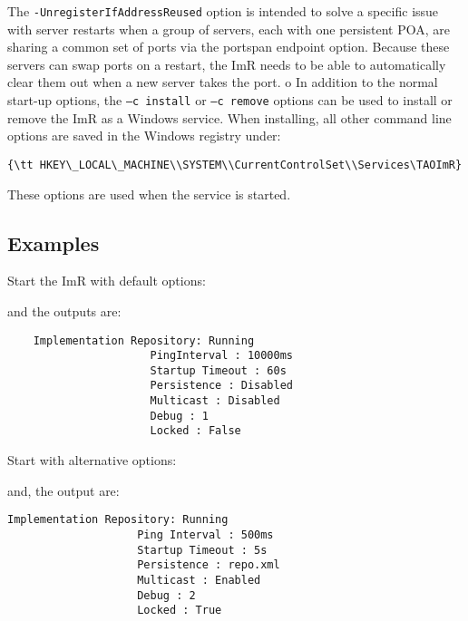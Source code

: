 The {\tt -UnregisterIfAddressReused} option is intended to solve a specific issue with server restarts
when a group of servers, each with one persistent POA, are sharing a common set of ports via the
portspan endpoint option. Because these servers can swap ports on a restart, the ImR needs to be able
to automatically clear them out when a new server takes the port.
o
In addition to the normal start-up options, the {\tt–c install} or {\tt–c remove} options can be used to
install or remove the ImR as a Windows service. When installing, all other command line options are
saved in the Windows registry under:

\small{
\begin{verbatim}
{\tt HKEY\_LOCAL\_MACHINE\\SYSTEM\\CurrentControlSet\\Services\TAOImR}
\end{verbatim}
}

These options are used when the service is started.

\subsection{Examples}

Start the ImR with default options:


and the outputs are:

\begin{verbatim}
    Implementation Repository: Running
                      PingInterval : 10000ms
                      Startup Timeout : 60s
                      Persistence : Disabled
                      Multicast : Disabled
                      Debug : 1
                      Locked : False
\end{verbatim}

Start with alternative options:


and, the output are:

\begin{verbatim}
Implementation Repository: Running
                    Ping Interval : 500ms
                    Startup Timeout : 5s
                    Persistence : repo.xml
                    Multicast : Enabled
                    Debug : 2
                    Locked : True
\end{verbatim}

